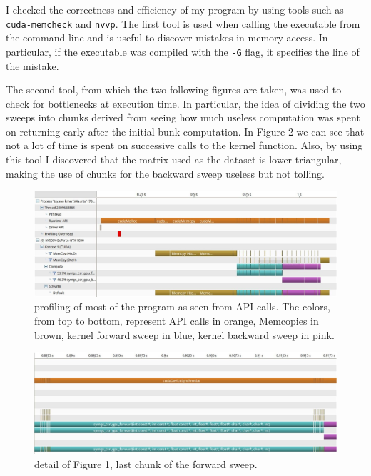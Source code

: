 \documentclass[a4paper,oneside]{report}
\begin{document}
    I checked the correctness and efficiency of my program by using tools such as \verb|cuda-memcheck| and \verb|nvvp|. The first tool is used when calling the executable from the command line and is useful to discover mistakes in memory access. In particular, if the executable was compiled with the \verb|-G| flag, it specifies the line of the mistake.

    The second tool, from which the two following figures are taken, was used to check for bottlenecks at execution time. In particular, the idea of dividing the two sweeps into chunks derived from seeing how much useless computation was spent on returning early after the initial bunk computation. In Figure 2 we can see that not a lot of time is spent on successive calls to the kernel function. Also, by using this tool I discovered that the matrix used as the dataset is lower triangular, making the use of chunks for the backward sweep useless but not tolling.

    \begin{figure}[h!]
        \centering
        \includegraphics[width=1\columnwidth]{./images/whole-T}
        \caption{profiling of most of the program as seen from API calls. The colors, from top to bottom, represent API calls in orange, Memcopies in brown, kernel forward sweep in blue, kernel backward sweep in pink.}
    \end{figure}

    \begin{figure}[h!]
        \centering
        \includegraphics[width=1\columnwidth]{./images/forward-T}
        \caption{detail of Figure 1, last chunk of the forward sweep.}
    \end{figure}
    
\end{document}
